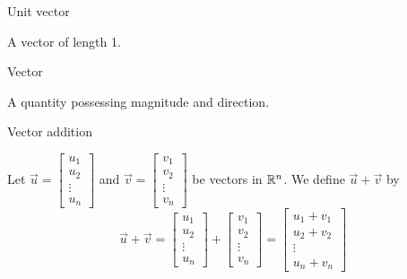 \documentclass{ximera}
\begin{document}

Unit vector

\begin{expandable}
    A vector of length 1.
\end{expandable}


Vector

\begin{expandable}
    A quantity possessing magnitude and direction.
\end{expandable}


Vector addition

\begin{expandable}
  Let $\vec{u}=\begin{bmatrix}
u_1\\
u_2\\
\vdots\\
u_n
\end{bmatrix}$ and $\vec{v}=\begin{bmatrix}
v_1\\
v_2\\
\vdots\\
v_n
\end{bmatrix}$ be vectors in $\mathbb{R}^n$.  We define $\vec{u}+\vec{v}$ by
  $$\vec{u}+\vec{v}=\begin{bmatrix}
u_1\\
u_2\\
\vdots\\
u_n
\end{bmatrix}+\begin{bmatrix}
v_1\\
v_2\\
\vdots\\
v_n
\end{bmatrix}=\begin{bmatrix}
u_1+v_1\\
u_2+v_2\\
\vdots\\
u_n+v_n
\end{bmatrix}$$
  \end{expandable}
\end{document}
